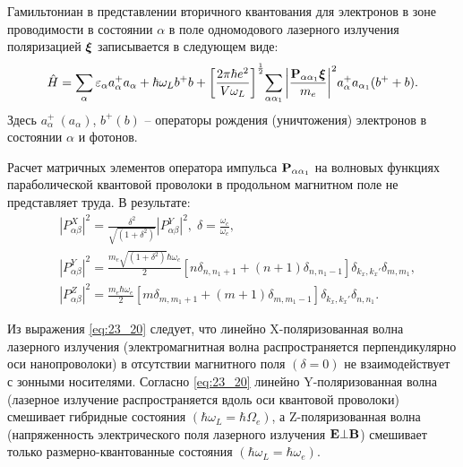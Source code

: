 Гамильтониан в представлении вторичного квантования для электронов в зоне проводимости в состоянии $\alpha $ в поле одномодового лазерного излучения поляризацией $\boldsymbol{\mathbf{\xi}}$ записывается в следующем виде:
\begin{equation} \label{eq:23_10} 
\hat{H}=\sum_{\alpha } {\varepsilon_{\alpha } a^+_{\alpha } a_{\alpha }} + \hbar \omega_L b^+ b + {\left[\frac{2\pi \hbar e^2} {V \omega_L} \right]}^{\frac{1}{2}} {\sum_{\alpha \alpha_1}{\left|\frac{\boldsymbol{\mathbf{P}}_{\alpha \alpha_1} \boldsymbol{\mathbf{\xi}}}{m_e}\right|}}^2 a^+_{\alpha } a_{\alpha_1} (b^+ + b).
\end{equation}
Здесь $a^+_{\alpha }\ (a_{\alpha })$, $b^+ (b)$ -- операторы рождения (уничтожения) электронов в состоянии $\alpha $ и фотонов.

Расчет матричных элементов оператора импульса $\boldsymbol{\mathbf{P}}_{\alpha\alpha_1}$ на волновых функциях параболической квантовой проволоки в продольном магнитном поле \cite{Hashimzade2005} не представляет труда. В результате:
\begin{equation} \label{eq:23_20}
\begin{aligned}
&{\left| P^X_{\alpha \beta }\right|}^2=\frac{\delta^2}{\sqrt{\left(1+\delta^2\right)} }{\left|P^Y_{\alpha \beta }\right|}^2, \;
\delta =\frac{\omega_c}{\omega_e},\\
&\left| P^Y_{\alpha \beta }\right|^2=
\frac{m_e \sqrt{\left({1+\delta }^2\right)} \hbar\omega_e}{2} \left[  n \delta_{n,n_1+1} + (n+1) \delta_{n,n_1-1} \right]\delta_{k_x,k_x'}\delta_{m,m_1} , \\
&{\left| P^Z_{\alpha \beta }\right|}^2=\frac{m_e \hbar\omega_e}{2} \left[ m \delta_{m,m_1+1} + (m+1){\delta }_{m,m_1-1} \right]  \delta_{k_x,k_x'} \delta_{n,n_1}.
\end{aligned}
\end{equation}

Из выражения \eqref{eq:23_20} следует, что линейно X-поляризованная волна лазерного излучения (электромагнитная волна распространяется перпендикулярно оси нанопроволоки) в отсутствии магнитного поля $(\delta =0)$ не взаимодействует с зонными носителями. Согласно \eqref{eq:23_20} линейно Y-поляризованная волна (лазерное излучение распространяется вдоль оси квантовой проволоки) смешивает гибридные состояния $\left( \hbar\omega_L = \hbar\Omega_e \right) $, а Z-поляризованная волна (напряженность электрического поля лазерного излучения $\boldsymbol{\mathbf{E}}\bot \boldsymbol{\mathbf{B}}$) смешивает только размерно-квантованные состояния $ \left( \hbar\omega_L = \hbar\omega_e \right) $.

